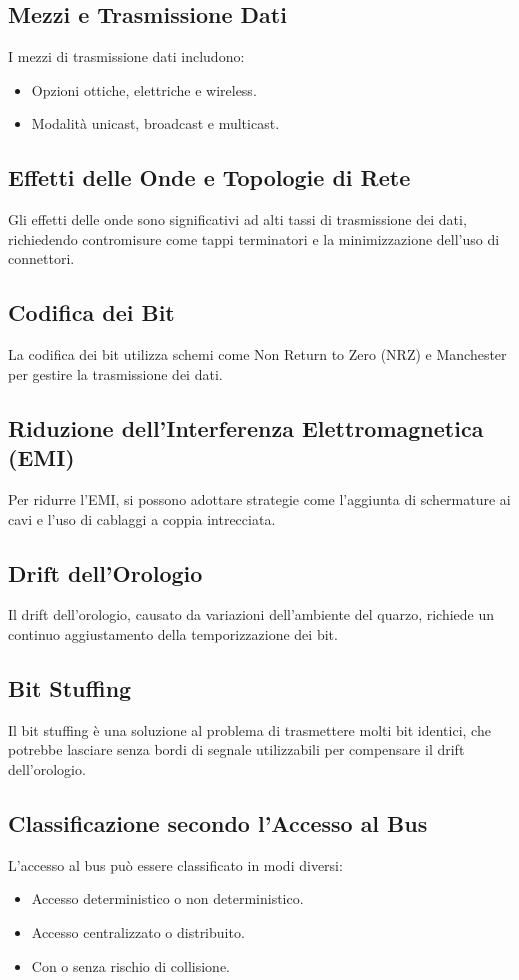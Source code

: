 \subsection{Mezzi e Trasmissione Dati}
I mezzi di trasmissione dati includono:
\begin{itemize}
    \item Opzioni ottiche, elettriche e wireless.
    \item Modalità unicast, broadcast e multicast.
\end{itemize}

\subsection{Effetti delle Onde e Topologie di Rete}
Gli effetti delle onde sono significativi ad alti tassi di trasmissione dei dati, richiedendo contromisure come tappi terminatori e la minimizzazione dell'uso di connettori.

\subsection{Codifica dei Bit}
La codifica dei bit utilizza schemi come Non Return to Zero (NRZ) e Manchester per gestire la trasmissione dei dati.

\subsection{Riduzione dell'Interferenza Elettromagnetica (EMI)}
Per ridurre l'EMI, si possono adottare strategie come l'aggiunta di schermature ai cavi e l'uso di cablaggi a coppia intrecciata.

\subsection{Drift dell'Orologio}
Il drift dell'orologio, causato da variazioni dell'ambiente del quarzo, richiede un continuo aggiustamento della temporizzazione dei bit.

\subsection{Bit Stuffing}
Il bit stuffing è una soluzione al problema di trasmettere molti bit identici, che potrebbe lasciare senza bordi di segnale utilizzabili per compensare il drift dell'orologio.

\subsection{Classificazione secondo l'Accesso al Bus}
L'accesso al bus può essere classificato in modi diversi:
\begin{itemize}
    \item Accesso deterministico o non deterministico.
    \item Accesso centralizzato o distribuito.
    \item Con o senza rischio di collisione.
\end{itemize}


